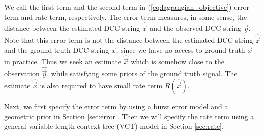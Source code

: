 We call the first term and the second term in (\ref{eq:lagrangian_objective}) error term and rate term, respectively.
The error term measures, in some sense, the distance between the estimated DCC string $\hat{\vec{x}}$ and the observed DCC string $\vec{y}$.
Note that this error term is not the distance between the estimated DCC string $\hat{\vec{x}}$ and the ground truth DCC string $\vec{x}$, since we have no access to ground truth $\vec{x}$ in practice.
Thus we seek an estimate $\hat{\vec{x}}$ which is somehow close to the observation $\hat{\vec{y}}$, while satisfying some priors of the ground truth signal.
The estimate $\hat{\vec{x}}$ is also required to have small rate term $R(\hat{\vec{x}})$.

Next, we first specify the error term by using a burst error model and a geometric prior in Section \ref{sec:error}.
Then we will specify the rate term using a general variable-length context tree (VCT) model \cite{begleiter2004prediction} in Section \ref{sec:rate}.